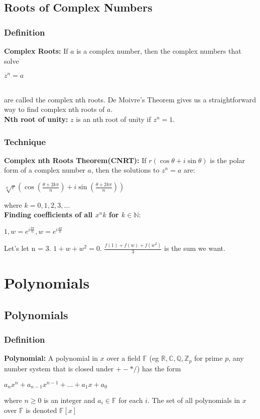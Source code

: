 \documentclass[12pt]{report}
\begin{document}
	\section{Roots of Complex Numbers}
		\subsection{Definition}
			\textbf{Complex Roots: }If $a$ is a complex number, then the complex numbers that solve \\
			\centerline{$z^n = a$} \\
			are called the complex nth roots. De Moivre's Theorem gives us a straightforward way to find complex nth roots of $a$.\\
			\textbf{Nth root of unity:} $z$ is an nth root of unity if $z^n = 1$.
		\subsection{Technique}
			\textbf{Complex nth Roots Theorem(CNRT):} If $r(\cos \theta + i \sin \theta)$ is the polar form of a complex number $a$, then the solutions to $z^n = a$ are:\\
			\centerline{$\sqrt[n]{r}(\cos (\frac{\theta + 2k\pi}{n}) + i \sin (\frac{\theta + 2k\pi}{n}))$}
			where $k = 0,1,2,3,...$\\
			\textbf{Finding coefficients of all $x^nk$ for $k \in \mathbb{N}$}: \\
			\centerline{$1, w = e^{i\frac{2\pi}{n}}, w = e^{i\frac{4\pi}{n}}$}
			Let's let n = 3. $1 + w + w^2 = 0$. $\frac{f(1) + f(w) + f(w^2)}{3}$ is the sum we want.
			
\chapter{Polynomials}
	\section{Polynomials}
		\subsection{Definition}
			\textbf{Polynomial:} A polynomial in $x$ over a field $\mathbb{F}$ (eg $\mathbb{R}, \mathbb{C}, \mathbb{Q}, \mathbb{Z}_p$ for prime $p$, any number system that is closed under $+-*/$) has the form \\
			\centerline{$a_nx^n + a_{n-1}x^{n-1} + ... + a_1x + a_0$} where $n \geq 0$ is an integer and $a_i \in \mathbb{F}$ for each $i$. The set of all polynomials in $x$ over $\mathbb{F}$ is denoted $\mathbb{F}[x]$	
\end{document}
